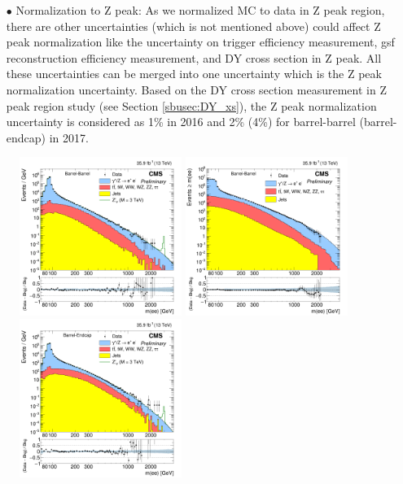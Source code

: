 \begin{itemize}
  \item[$\bullet$] Normalization to Z peak: As we normalized MC to data in Z peak region, there are other uncertainties (which is not mentioned above) could affect Z peak normalization like the uncertainty on trigger efficiency measurement, gsf reconstruction efficiency measurement, and DY cross section in Z peak. All these uncertainties can be merged into one uncertainty which is the Z peak normalization uncertainty. Based on the DY cross section measurement in Z peak region study (see Section \ref{sbusec:DY_xs}), the Z peak normalization uncertainty is considered as 1\% in 2016 and 2\% (4\%) for barrel-barrel (barrel-endcap) in 2017.
\end{itemize}


\begin{figure}[!htbp]
  \begin{center}
    \includegraphics[width=0.47\textwidth]{figures/Zprime/2016/mass/massHistEBEB}
    \includegraphics[width=0.47\textwidth]{figures/Zprime/2016/mass/cMassHistEBEB}
    \includegraphics[width=0.47\textwidth]{figures/Zprime/2016/mass/massHistEBEE}

\end{center}
\end{figure}
